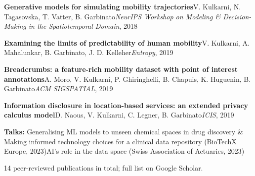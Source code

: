 
\vspace{-0.2cm}
\begin{itemize}[leftmargin=*]
\small{
  \item \textbf{Generative models for simulating mobility trajectories}{\enskip\cdotp\enskip}V. Kulkarni, N. Tagasovska, T. Vatter, B. Garbinato{\enskip\cdotp\enskip}\textit{NeurIPS Workshop on Modeling \& Decision-Making in the Spatiotemporal Domain}, 2018
  \item \textbf{Examining the limits of predictability of human mobility}{\enskip\cdotp\enskip}V. Kulkarni, A. Mahalunkar, B. Garbinato, J. D. Kelleher{\enskip\cdotp\enskip}\textit{Entropy}, 2019
  \item \textbf{Breadcrumbs: a feature-rich mobility dataset with point of interest annotations}{\enskip\cdotp\enskip}A. Moro, V. Kulkarni, P. Ghiringhelli, B. Chapuis, K. Huguenin, B. Garbinato{\enskip\cdotp\enskip}\textit{ACM SIGSPATIAL}, 2019
  \item \textbf{Information disclosure in location-based services: an extended privacy calculus model}{\enskip\cdotp\enskip}D. Naous, V. Kulkarni, C. Legner, B. Garbinato{\enskip\cdotp\enskip}\textit{ICIS}, 2019
  \item \textbf{Talks:} Generalising ML models to unseen chemical spaces in drug discovery \& Making informed technology choices for a clinical data repository (BioTechX Europe, 2023){\enskip\cdotp\enskip}AI's role in the data space (Swiss Association of Actuaries, 2023)
}
\end{itemize}
\vspace{-0.2cm}
{\small\color{graytext} 14 peer-reviewed publications in total; full list on Google Scholar.}\par
\vspace{0.1cm}
